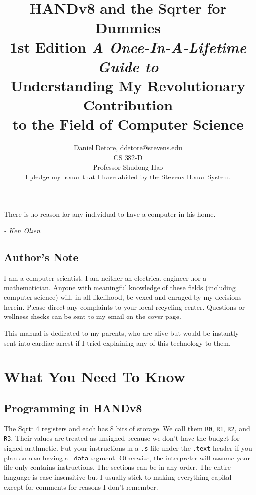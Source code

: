 \documentclass[12pt, oneside]{memoir}
\title{
    {\HUGE\bfseries HANDv8 and the Sqrter for Dummies}\\
    {\large\bfseries 1st Edition}\linebreak\linebreak
    {\large\textit{A Once-In-A-Lifetime Guide to}}\\
    {\Large Understanding My Revolutionary Contribution\\to the Field of Computer Science}\linebreak\linebreak\linebreak\linebreak\linebreak\linebreak\linebreak\linebreak\linebreak\linebreak\linebreak\linebreak\linebreak
}
\author{
    {\Large Daniel Detore}, ddetore@stevens.edu\\
    CS 382-D\\
    Professor Shudong Hao\\
    {I pledge my honor that I have abided by the Stevens Honor System.}
}
\newcommand{\R}[1]{{\color{register}\texttt{R#1}}}
\newcommand{\header}[1]{{\color{header}\texttt{#1}}}
\begin{document}
\frontmatter


\maketitle
\thispagestyle{empty}
\newpage

\raggedright

\epigraph{There is no reason for any individual to have a computer in his home.}{\textit{- Ken Olsen}}
\tableofcontents*
\newpage

\setlength{\parindent}{1.5em}
\setlength{\parskip}{1em}

\chapter{Author's Note}
I am a computer scientist. I am neither an electrical engineer nor a mathematician. Anyone with meaningful knowledge of these fields (including computer science) will, in all likelihood, be vexed and enraged by my decisions herein. Please direct any complaints to your local recycling center. Questions or wellness checks can be sent to my email on the cover page.

This manual is dedicated to my parents, who are alive but would be instantly sent into cardiac arrest if I tried explaining any of this technology to them.

\mainmatter
\part{What You Need To Know}

\chapter{Programming in HANDv8}
The Sqrtr 4 registers and each has 8 bits of storage. We call them \R{0}, \R{1}, \R{2}, and \R{3}. Their values are treated as unsigned because we don't have the budget for signed arithmetic. Put your instructions in a \texttt{.s} file under the \header{.text} header if you plan on also having a \header{.data} segment. Otherwise, the interpreter will assume your file only contains instructions. The sections can be in any order. The entire language is case-insensitive but I usually stick to making everything capital except for comments for reasons I don't remember.
\end{document}
